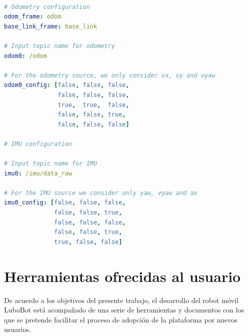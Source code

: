 \makeatother

\newcommand\ProcessThreeDashes{\llap{\color{cyan}\mdseries-{-}-}}

\begin{lstlisting}[language=yaml, label=cod:rosLocalization, caption=Configuraciones del filtro proveído por el paquete ros\_localization \protect\footnotemark.]

# Odometry configuration
odom_frame: odom
base_link_frame: base_link

# Input topic name for odometry
odom0: /odom

# For the odometry source, we only consider vx, vy and vyaw
odom0_config: [false, false, false,
               false, false, false,
               true,  true,  false,
               false, false, true,
               false, false, false]

# IMU configuration

# Input topic name for IMU
imu0: /imu/data_raw

# For the IMU source we consider only yaw, vyaw and ax
imu0_config: [false, false, false,
              false, false, true,
              false, false, false,
              false, false, true,
              true, false, false]

\end{lstlisting}



\section{Herramientas ofrecidas al usuario}

De acuerdo a los objetivos del presente trabajo, el desarrollo del robot móvil LuboBot está acompañado de una serie de herramientas y documentos con los que se pretende facilitar el proceso de adopción de la plataforma por nuevos usuarios.

